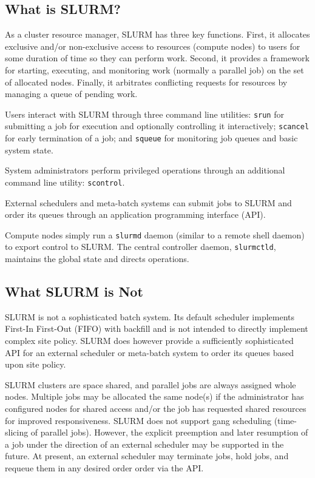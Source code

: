 \subsection{What is SLURM?}

As a cluster resource manager, SLURM has three key functions.  First,
it allocates exclusive and/or non-exclusive access to resources (compute nodes) to users for 
some duration of time so they can perform work.  Second, it provides 
a framework for starting, executing, and monitoring work (normally a 
parallel job) on the set of allocated nodes.  Finally, it arbitrates 
conflicting requests for resources by managing a queue of pending work.

Users interact with SLURM through three command line utilities: 
{\tt srun} for submitting a job for execution and optionally controlling it
interactively; 
{\tt scancel} for early termination of a job; 
and {\tt squeue} for monitoring job queues and basic system state.

System administrators perform privileged operations through an additional
command line utility: {\tt scontrol}.

External schedulers and meta-batch systems can submit jobs to SLURM and
order its queues through an application programming interface (API).

Compute nodes simply run a {\tt slurmd} daemon (similar to a remote shell 
daemon) to export control to SLURM.  The central controller daemon,
{\tt slurmctld}, maintains the global state and directs operations.

\subsection{What SLURM is Not}

SLURM is not a sophisticated batch system.  Its default scheduler
implements First-In First-Out (FIFO) with backfill and is not 
intended to directly implement complex site policy.
SLURM does however provide a sufficiently sophisticated API for an external 
scheduler or meta-batch system to order its queues based upon site policy.

SLURM clusters are space shared, and parallel jobs are always 
assigned whole nodes.  Multiple jobs may be allocated the same node(s) 
if the administrator has configured nodes for shared access and/or 
the job has requested shared resources for improved responsiveness.
SLURM does not support gang scheduling (time-slicing 
of parallel jobs). However, the explicit preemption and later resumption 
of a job under the direction of an external scheduler may be supported 
in the future. At present, an external scheduler may terminate jobs, 
hold jobs, and requeue them in any desired order order via the API. 

